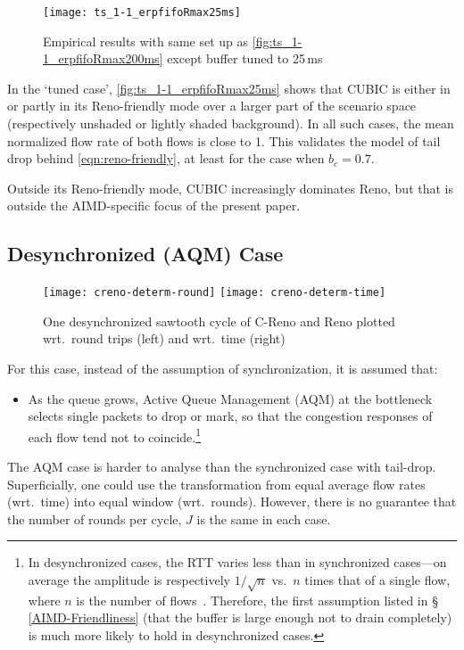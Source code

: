 \begin{figure}
	\centering
	\texttt{[image: ts\_1-1\_erpfifoRmax25ms]}
	\caption{Empirical results with same set up as \autoref{fig:ts_1-1_erpfifoRmax200ms} except buffer tuned to 25\,ms}\label{fig:ts_1-1_erpfifoRmax25ms}
\end{figure}

In the `tuned case', \autoref{fig:ts_1-1_erpfifoRmax25ms} shows that CUBIC is either in or partly in its Reno-friendly mode over a larger part of the scenario space (respectively unshaded or lightly shaded background). In all such cases, the mean normalized flow rate of both flows is close to 1. This validates the model of tail drop behind \autoref{eqn:reno-friendly}, at least for the case when \(b_c=0.7\).

Outside its Reno-friendly mode, CUBIC increasingly dominates Reno, but that is outside the AIMD-specific focus of the present paper.

\subsection{Desynchronized (AQM) Case}\label{AQM}
\begin{figure*}
	\centering
	\texttt{[image: creno-determ-round]}
	\texttt{[image: creno-determ-time]}
	\caption{One desynchronized sawtooth cycle of C-Reno and Reno plotted wrt.\ round trips (left) and wrt.\ time (right)}\label{fig:creno-determ}
\end{figure*}

For this case, instead of the assumption of synchronization, it is assumed that:
\begin{itemize}[nosep]
	\item As the queue grows, Active Queue Management (AQM) at the bottleneck selects single packets to drop or mark, so that the congestion responses of each flow tend not to coincide.\footnote{In desynchronized cases, the RTT varies less than in synchronized cases---on average the amplitude is respectively \(1/\sqrt{n}\) vs.\ \(n\) times that of a single flow, where \(n\) is the number of flows~\cite{Appenzeller04:Sizing_buffers}. Therefore, the first assumption listed in \S\,\ref{AIMD-Friendliness} (that the buffer is large enough not to drain completely) is much more likely to hold in desynchronized cases.}
\end{itemize}

The AQM case is harder to analyse than the synchronized case with tail-drop. Superficially, one could use the transformation from equal average flow rates (wrt.\ time) into equal window (wrt.\ rounds). However, there is no guarantee that the number of rounds per cycle, \(J\) is the same in each case.

